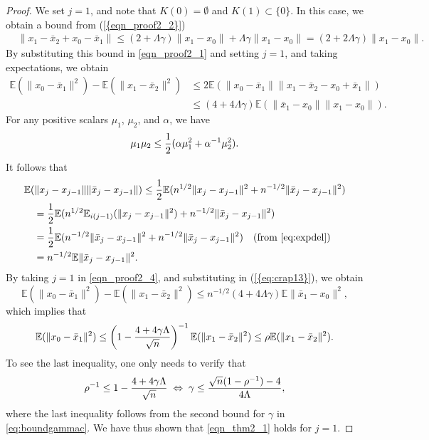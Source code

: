 \documentclass{siamltex}
\begin{document}
\begin{proof}
We set $j=1$, and note that $K(0)=\emptyset$ and $K(1)\subset
\{0\}$. In this case, we obtain a bound from {(\ref{{eqn_proof2_2}})}
\begin{align*}
&\|x_1-\bar{x}_{2}+x_{0}-\bar{x}_1\| \leq \left(2+{\Lambda\gamma}\right)\|x_1-x_{0}\| + {\Lambda\gamma} \|x_1-x_0\| = \left(2+{2\Lambda\gamma}\right)\|x_1-x_{0}\|.
\end{align*}
By substituting this bound in \eqref{eqn_proof2_1} and setting $j=1$,
and taking expectations, we obtain 
\begin{align}
\nonumber
{\mathbb{E}}(\|x_{0}-\bar{x}_1\|^2) - {\mathbb{E}}(\|x_1-\bar{x}_{2}\|^2) & \leq
2{\mathbb{E}}(\|x_{0}-\bar{x}_1\| {\|x_1-\bar{x}_{2}-x_{0}+\bar{x}_1\|}) \\
 \label{eq:crap13}
& \leq
\left(4+{4\Lambda\gamma}\right){\mathbb{E}}(\|\bar{x}_1-x_{0}\|\|x_1-x_{0}\|).
\end{align}
For any positive scalars $\mu_1$, $\mu_2$, and $\alpha$, we have
\begin{equation} \label{eq:gtrick} \mu_1\mu_2 \leq {1\over 2}(\alpha \mu_1^2 +
\alpha^{-1} \mu_2^2).  
\end{equation} 
It follows that 
\begin{align}
\nonumber
&{\mathbb{E}} (\|x_{j}-x_{j-1}\| \|\bar{x}_j -x_{j-1}\|) \leq {1\over 2}{\mathbb{E}}(n^{1/2}\|x_{j}-x_{j-1}\|^2 + n^{-1/2}\|\bar{x}_j -x_{j-1}\|^2)\\
\nonumber
&\quad = {1\over 2}{\mathbb{E}}(n^{1/2}{\mathbb{E}}_{i(j-1)}(\|x_{j}-x_{j-1}\|^2) + n^{-1/2}\|\bar{x}_j -x_{j-1}\|^2)\\
\nonumber
&\quad = {1\over 2}{\mathbb{E}}(n^{-1/2}\|\bar{x}_{j}-x_{j-1}\|^2 + n^{-1/2}\|\bar{x}_j -x_{j-1}\|^2)\quad (\text{from \eqref{eq:expdel}})\\
\label{eqn_proof2_4}
&\quad = n^{-1/2}{\mathbb{E}} \|\bar{x}_j -x_{j-1}\|^2.
\end{align}
By taking $j=1$ in \eqref{eqn_proof2_4}, and substituting in
{(\ref{{eq:crap13}})}, we obtain
\[
 {\mathbb{E}}(\|x_{0}-\bar{x}_1\|^2) - {\mathbb{E}}(\|x_1-\bar{x}_{2}\|^2) \leq n^{-1/2}\left(4+{4\Lambda\gamma}\right){\mathbb{E}} \|\bar{x}_1 -x_{0}\|^2,
\]
which implies that
\[
 {\mathbb{E}}(\|x_{0}-\bar{x}_1\|^2) \leq \left(1- {4 + {4\gamma \Lambda}\over \sqrt{n}}\right)^{-1} {\mathbb{E}}(\|x_1-\bar{x}_{2}\|^2) \leq \rho  {\mathbb{E}}(\|x_1-\bar{x}_{2}\|^2).
\]
To see the last inequality, one only needs to verify that
\[
\rho^{-1} \leq 1-{4+ 4\gamma \Lambda \over \sqrt{n}} \;
\Leftrightarrow \;  \gamma \leq \frac{\sqrt{n}(1-\rho^{-1}) - 4}{4\Lambda},
\]
where the last inequality follows from the second bound for $\gamma$ in \eqref{eq:boundgammac}. We have thus shown that \eqref{eqn_thm2_1} holds for $j=1$.


\end{proof}
\end{document}
